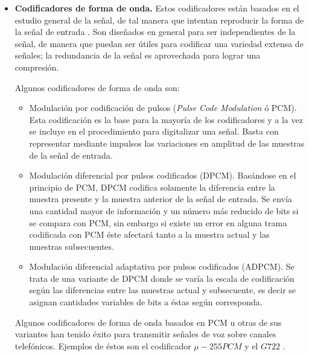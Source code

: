 \begin{itemize} 
	\item \textbf{Codificadores de forma de onda.} Estos codificadores están basados en el estudio general de la señal, de tal manera que intentan reproducir la forma de la señal de entrada \cite[]{OReilly1984}. Son diseñados en general para ser independientes de la señal, de manera que puedan ser útiles para  codificar una variedad extensa de señales; la redundancia de la señal es aprovechada para lograr una compresión. 
		
	Algunos codificadores de forma de onda son:			
	\begin{itemize}
				\item Modulación por codificación de pulsos (\emph{Pulse Code Modulation} ó PCM). Esta codificación es la base para la 						mayoría de los codificadores y a la vez se incluye en el procedimiento para digitalizar una señal. Basta con 							representar mediante impulsos las variaciones en amplitud de las muestras de la señal de entrada.
				\item Modulación diferencial por pulsos codificados (DPCM). Basándose en el principio de PCM, DPCM codifica solamente la 						diferencia entre la muestra presente y la muestra anterior de la señal de entrada. Se envía una cantidad mayor de 						información y un número más reducido de bits si se compara con PCM, sin embargo si existe un error en alguna 						trama codificada con PCM éste afectará tanto a la muestra actual y las muestras subsecuentes.
				\item Modulación diferencial adaptativa por pulsos codificados (ADPCM). Se trata de una variante de DPCM donde se varía la 					escala de codificación según las diferencias entre las muestras actual y subsecuente, es decir se asignan cantidades 						variables de bits a éstas según corresponda.
			\end{itemize}
Algunos codificadores de forma de onda basados en PCM u otras de sus variantes han tenido éxito para transmitir señales de voz sobre canales telefónicos. Ejemplos de éstos son el codificador $\mu-255 PCM$ \cite[]{Dammann1972} y el $G722$ \mbox{\cite[]{Mermelstein1988}}.  


\end{itemize}
